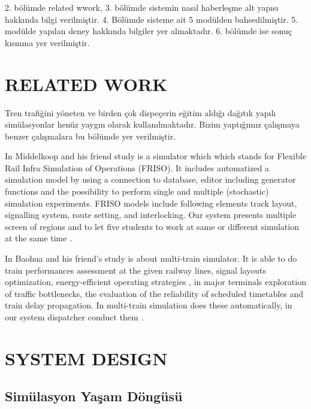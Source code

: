 \documentclass[conference]{IEEEtran}
\begin{document}
2. bölümde related wwork, 3. bölümde sistemin nasıl haberleşme alt yapısı hakkında bilgi verilmiştir. 4. Bölümde sisteme ait 5 modülden bahsedilmiştir. 5. modülde yapılan deney hakkında bilgiler yer almaktadır. 6.  bölümde ise sonuç kısmına yer verilmiştir.


\section{RELATED WORK}

Tren trafiğini yöneten ve birden çok dispeçerin eğitim aldığı dağıtık yapılı simülasyonlar henüz yaygın olarak kullanılmaktadır. Bizim yaptığımız çalışmaya benzer çalışmalara bu bölümde yer verilmiştir.

In Middelkoop and his friend study is a simulator which which stands for Flexible Rail Infra Simulation of Operations (FRISO). It includes automatized  a simulation model by using a connection to database, editor including generator functions and the possibility to perform single and multiple (stochastic) simulation experiments. FRISO models include following elements  track layout, signalling system, route setting, and interlocking. Our system presents multiple screen of regions and to let five students to work at same or different simulation at the same time \cite{FRISO}.

 


In Baohua  and his friend's study is about  multi-train simulator. It is able to do  train performances assessment at the given railway lines, signal layouts optimization, energy-efficient operating strategies , in major terminals exploration of traffic bottlenecks, the evaluation of the reliability of scheduled timetables and train delay propagation. In multi-train simulation does these automatically, in our system dispatcher conduct them \cite{ICVES}.




\section{SYSTEM DESIGN}
\subsection{Simülasyon Yaşam Döngüsü}
\end{document}
